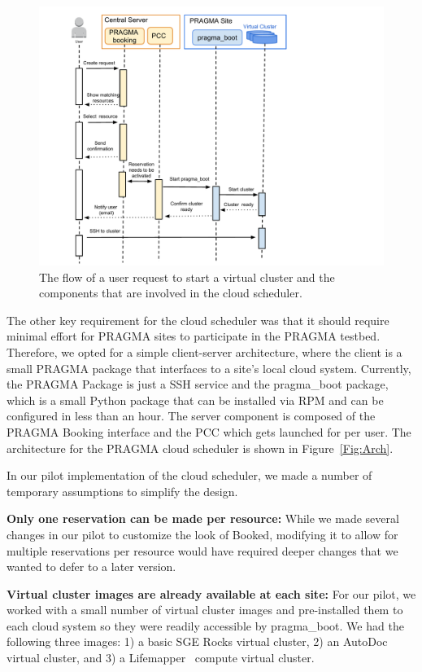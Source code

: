 \documentclass{acm_proc_article-sp}
\begin{document}
\begin{figure}[htbp]
\begin{center}
\includegraphics[width=\columnwidth]{figures/flow.pdf}
\caption{The flow of a user request to start a virtual cluster and the components that are involved in the cloud scheduler.}
\label{Fig:Flow}
\end{center}
\end{figure}

The other key requirement for the cloud scheduler was that it should require minimal effort for PRAGMA sites to participate in the PRAGMA testbed.  Therefore, we opted for a simple client-server architecture, where the client is a small PRAGMA package that interfaces to a site's local cloud system.  Currently, the PRAGMA Package is just a SSH service and the pragma\_boot package, which is a small Python package that can be installed via RPM and can be configured in less than an hour.  The server component is composed of the PRAGMA Booking interface and the PCC which gets launched for per user.  The architecture for the PRAGMA cloud scheduler is shown in Figure~\ref{Fig:Arch}.

In our pilot implementation of the cloud scheduler, we made a number of temporary assumptions to simplify the design.

\textbf{Only one reservation can be made per resource:}  While we made several changes in our pilot to customize the look of Booked, modifying it to allow for multiple reservations per resource would have required deeper changes that we wanted to defer to a later version.   

\textbf{Virtual cluster images are already available at each site:}  For our pilot, we worked with a small number of virtual cluster images and pre-installed them to each cloud system so they were readily accessible by pragma\_boot.  We had the following three images: 1) a basic SGE Rocks virtual cluster, 2) an AutoDoc virtual cluster, and 3) a Lifemapper~\cite{lifemapper} compute virtual cluster.   
\end{document}
